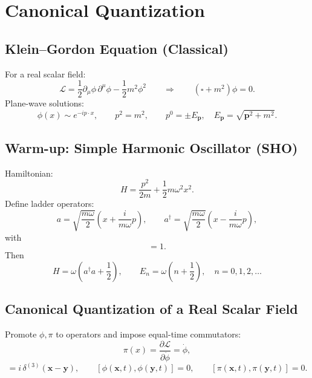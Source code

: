 \section{Canonical Quantization}

\subsection{Klein--Gordon Equation (Classical)}
For a real scalar field:
\begin{equation}
\mathcal{L}=\frac12 \partial_\mu\phi\,\partial^\mu\phi-\frac12 m^2\phi^2
\qquad\Rightarrow\qquad
(\square+m^2)\phi=0.
\end{equation}
Plane-wave solutions:
\begin{equation}
\phi(x)\sim e^{-ip\cdot x},\qquad p^2=m^2,\qquad p^0=\pm E_{\mathbf{p}},\quad
E_{\mathbf{p}}=\sqrt{\mathbf{p}^2+m^2}.
\end{equation}

\subsection{Warm-up: Simple Harmonic Oscillator (SHO)}
Hamiltonian:
\begin{equation}
H=\frac{p^2}{2m}+\frac12 m\omega^2 x^2.
\end{equation}
Define ladder operators:
\begin{equation}
a=\sqrt{\frac{m\omega}{2}}\left(x+\frac{i}{m\omega}p\right),\qquad
a^\dagger=\sqrt{\frac{m\omega}{2}}\left(x-\frac{i}{m\omega}p\right),
\end{equation}
with
\begin{equation}
[a,a^\dagger]=1.
\end{equation}
Then
\begin{equation}
H=\omega\left(a^\dagger a+\frac12\right),
\qquad
E_n=\omega\left(n+\frac12\right),\quad n=0,1,2,\dots
\end{equation}

\subsection{Canonical Quantization of a Real Scalar Field}
Promote $\phi,\pi$ to operators and impose equal-time commutators:
\begin{equation}
\pi(x)=\frac{\partial\mathcal{L}}{\partial\dot{\phi}}=\dot{\phi},
\end{equation}
\begin{equation}
[\phi(\mathbf{x},t),\pi(\mathbf{y},t)]=i\,\delta^{(3)}(\mathbf{x}-\mathbf{y}),
\qquad
[\phi(\mathbf{x},t),\phi(\mathbf{y},t)]=0,
\qquad
[\pi(\mathbf{x},t),\pi(\mathbf{y},t)]=0.
\end{equation}

